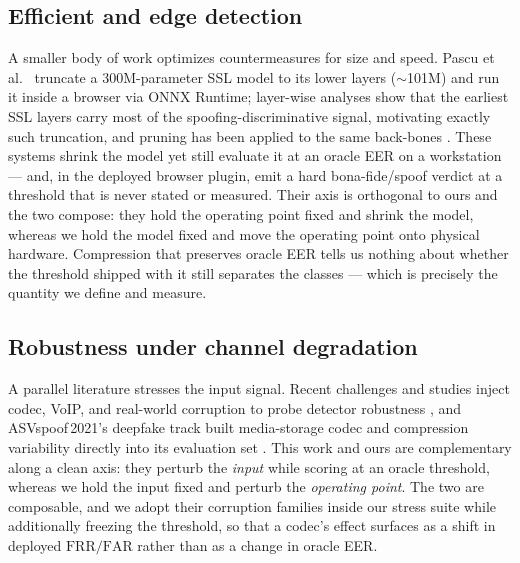 \documentclass[journal]{IEEEtran}
\newcommand{\frr}{\mathrm{FRR}}
\newcommand{\far}{\mathrm{FAR}}
\begin{document}
\subsection{Efficient and edge detection}
A smaller body of work optimizes countermeasures for size and speed. Pascu et
al.\ \cite{pascu25_edge_plugin} truncate a 300M-parameter SSL model to its lower
layers (\(\sim\)\num{101}M) and run it inside a browser via ONNX Runtime;
layer-wise analyses \cite{elkheir25_layerwise} show that the earliest SSL layers
carry most of the spoofing-discriminative signal, motivating exactly such
truncation, and pruning has been applied to the same back-bones
\cite{pruning_ssl}. These systems shrink the model yet still evaluate it at an
oracle EER on a workstation --- and, in the deployed browser plugin, emit a hard
bona-fide/spoof verdict at a threshold that is never stated or measured. Their
axis is orthogonal to ours and the two compose: they hold the operating point
fixed and shrink the model, whereas we hold the model fixed and move the
operating point onto physical hardware. Compression that preserves oracle EER
tells us nothing about whether the threshold shipped with it still separates the
classes --- which is precisely the quantity we define and measure.

\subsection{Robustness under channel degradation}
A parallel literature stresses the input signal. Recent challenges and studies
inject codec, VoIP, and real-world corruption to probe detector robustness
\cite{radar26,realworld_comms24}, and ASVspoof\,2021's deepfake track built
media-storage codec and compression variability directly into its evaluation set
\cite{yamagishi21_asvspoof2021}. This work and ours are complementary along a
clean axis: they perturb the \emph{input} while scoring at an oracle threshold,
whereas we hold the input fixed and perturb the \emph{operating point}. The two
are composable, and we adopt their corruption families inside our stress suite
while additionally freezing the threshold, so that a codec's effect surfaces as a
shift in deployed \(\frr/\far\) rather than as a change in oracle EER.
\end{document}

